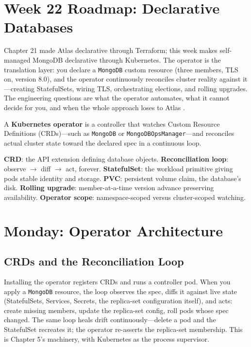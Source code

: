 \section{Week 22 Roadmap: Declarative Databases}
Chapter 21 made Atlas declarative through Terraform; this week makes self-managed MongoDB declarative through Kubernetes. The operator is the translation layer: you declare a \texttt{MongoDB} custom resource (three members, TLS on, version 8.0), and the operator continuously reconciles cluster reality against it---creating StatefulSets, wiring TLS, orchestrating elections, and rolling upgrades. The engineering questions are what the operator automates, what it cannot decide for you, and when the whole approach loses to Atlas \cite{mongodbK8sOperatorDocs}.

\begin{definitionbox}
A \textbf{Kubernetes operator} is a controller that watches Custom Resource Definitions (CRDs)---such as \texttt{MongoDB} or \texttt{MongoDBOpsManager}---and reconciles actual cluster state toward the declared spec in a continuous loop.
\end{definitionbox}

\begin{keyterms}
\textbf{CRD}: the API extension defining database objects. \textbf{Reconciliation loop}: observe $\to$ diff $\to$ act, forever. \textbf{StatefulSet}: the workload primitive giving pods stable identity and storage. \textbf{PVC}: persistent volume claim, the database's disk. \textbf{Rolling upgrade}: member-at-a-time version advance preserving availability. \textbf{Operator scope}: namespace-scoped versus cluster-scoped watching.
\end{keyterms}

\section{Monday: Operator Architecture}
\subsection{CRDs and the Reconciliation Loop}
Installing the operator registers CRDs and runs a controller pod. When you apply a \texttt{MongoDB} resource, the loop observes the spec, diffs it against live state (StatefulSets, Services, Secrets, the replica-set configuration itself), and acts: create missing members, update the replica-set config, roll pods whose spec changed. The same loop heals drift continuously---delete a pod and the StatefulSet recreates it; the operator re-asserts the replica-set membership. This is Chapter 5's machinery, with Kubernetes as the process supervisor.

